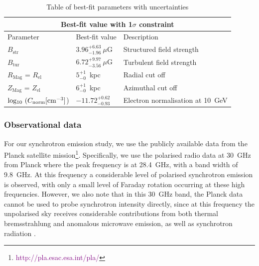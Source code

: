 \documentclass[usenatbib]{mnras}
\begin{document}
\begin{table}
\centering
\caption{Table of best-fit parameters with uncertainties}
\begin{tabular}{ |p{}|p{4.5cm}|p{6.5cm}|  }
\hline
\multicolumn{3}{|c|}{Best-fit value with 1$\sigma$ constraint} \\
\hline
\rule{0pt}{3ex}
Parameter & Best-fit value &Description \\
\hline
\hline
\rule{0pt}{3ex}
$B_{\mathrm{str}} $& $3.96_{-1.96}^{+6.63} ~ \mu$G & Structured field strength \\
\hline
\rule{0pt}{3ex}
$B_{\mathrm{tur}} $& $ 6.72_{-3.56}^{+9.97} ~\mu$G & Turbulent field strength\\
\hline
\rule{0pt}{3ex}
$R_{\mathrm{Mag}}$ = $R_{\mathrm{el}}$ & $5_{-0}^{+1}$~kpc & Radial cut off \\
\hline
\rule{0pt}{3ex}
$Z_{\mathrm{Mag}}$ = $Z_{\mathrm{el}}$ & $6_{-0}^{+1}$~kpc & Azimuthal cut off\\
\hline
\rule{0pt}{3ex} 
${\rm{log_{10}}}~(C_{\rm norm} [{\rm cm}^{-3}]$) & ${-11.72}_{{-0.93}}^{{+0.62}}$ & Electron normalisation at 10~GeV\\
\hline
\end{tabular}
\label{Para_table}
\end{table}

\subsubsection{Observational data}
For our synchrotron emission study, we use the publicly available data from the Planck satellite mission\footnote{\textcolor{purple}{http://pla.esac.esa.int/pla/}}. Specifically, we use the polarised radio data at 30~GHz from Planck where the peak frequency is at 28.4~GHz, with a band width of 9.8~GHz. At this frequency a considerable level of polarised synchrotron emission is observed, with only a small level of Faraday rotation occurring at these high frequencies. However, we also note that in this 30~GHz band, the Planck data cannot be used to probe synchrotron intensity directly, since at this frequency the unpolarised sky receives considerable contributions from both thermal bremsstrahlung and anomalous microwave emission, as well as synchrotron radiation \citep{Planck_XIX, Planck_X, Planck_XXV, Planck_XLII}. 
\end{document}
